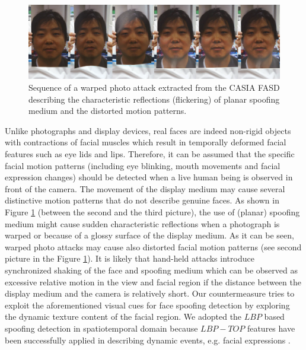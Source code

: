 \begin{figure}[!htb]
\begin{center}
\includegraphics [width=0.85\linewidth] {images/proposed_countermeasure/flicker.png}
\caption[Sequence of a warped photo attack extracted from the CASIA FASD]{Sequence of a warped photo attack extracted from the CASIA FASD \cite{zhangface} describing the characteristic reflections (flickering) of planar spoofing medium and the distorted motion patterns.} \label{fig:flickering}
\end{center}
\end{figure}

Unlike photographs and display devices, real faces are indeed non-rigid objects with contractions of facial muscles which result in temporally deformed facial features such as eye lids and lips. Therefore, it can be assumed that the specific facial motion patterns (including eye blinking, mouth movements and facial expression changes) should be detected when a live human being is observed in front of the camera. The movement of the display medium may cause several distinctive motion patterns that do not describe genuine faces. As shown in Figure \ref{fig:flickering} (between the second and the third picture), the use of (planar) spoofing medium might cause sudden characteristic reflections when a photograph is warped or because of a glossy surface of the display medium. As it can be seen, warped photo attacks may cause also distorted facial motion patterns (see second picture in the Figure \ref{fig:flickering}). It is likely that hand-held attacks introduce synchronized shaking of the face and spoofing medium which can be observed as excessive relative motion in the view and facial region if the distance between the display medium and the camera is relatively short. Our countermeasure tries to exploit the aforementioned visual cues for face spoofing detection by exploring the dynamic texture content of the facial region. We adopted the $LBP$ based spoofing detection in spatiotemporal domain because $LBP-TOP$ features have been successfully applied in describing dynamic events, e.g. facial expressions \cite{zhao2007dynamic}.

